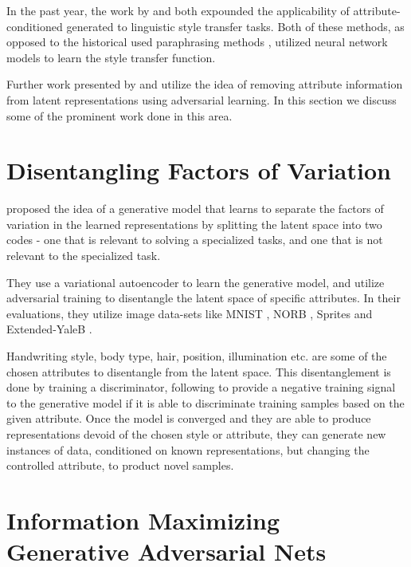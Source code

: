 In the past year, the work by \cite{hu2017toward} and \cite{ficler2017controlling} both expounded the applicability of attribute-conditioned generated to linguistic style transfer tasks. Both of these methods, as opposed to the historical used paraphrasing methods \citep{xu2012paraphrasing}, utilized neural network models \citep{lecun2015deep} to learn the style transfer function.

Further work presented by \cite{shen2017style} and \cite{fu2017style} utilize the idea of removing attribute information from latent representations using adversarial learning. In this section we discuss some of the prominent work done in this area.

\section{Disentangling Factors of Variation}

\cite{mathieu2016disentangling} proposed the idea of a generative model that learns to separate the factors of variation in the learned representations by splitting the latent space into two codes - one that is relevant to solving a specialized tasks, and one that is not relevant to the specialized task.

They use a variational autoencoder to learn the generative model, and utilize adversarial training to disentangle the latent space of specific attributes. In their evaluations, they utilize image data-sets like MNIST \citep{lecun2010mnist}, NORB \citep{lecun2004learning}, Sprites \citep{reed2015deep} and Extended-YaleB \citep{georghiades2001few}.

Handwriting style, body type, hair, position, illumination etc. are some of the chosen attributes to disentangle from the latent space. This disentanglement is done by training a discriminator, following \cite{goodfellow2014generative} to provide a negative training signal to the generative model if it is able to discriminate training samples based on the given attribute. Once the model is converged and they are able to produce representations devoid of the chosen style or attribute, they can generate new instances of data, conditioned on known representations, but changing the controlled attribute, to product novel samples.


\section{Information Maximizing Generative Adversarial Nets}

